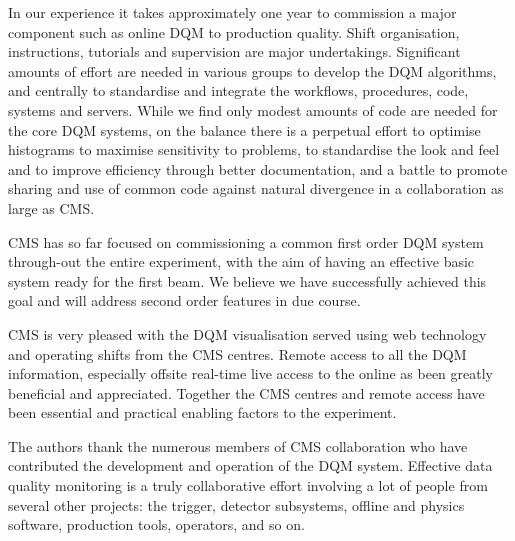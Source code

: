\documentclass[a4paper]{jpconf}
\begin{document}
In our experience it takes approximately one year to commission a major
component such as online DQM to production quality.  Shift organisation,
instructions, tutorials and supervision are major undertakings.  Significant
amounts of effort are needed in various groups to develop the DQM algorithms,
and centrally to standardise and integrate the workflows, procedures, code,
systems and servers.  While we find only modest amounts of code are needed for
the core DQM systems, on the balance there is a perpetual effort to optimise
histograms to maximise sensitivity to problems, to standardise the look and
feel and to improve efficiency through better documentation, and a battle to
promote sharing and use of common code against natural divergence in a
collaboration as large as CMS.

CMS has so far focused on commissioning a common first order DQM system
through-out the entire experiment, with the aim of having an effective basic
system ready for the first beam.  We believe we have successfully achieved
this goal and will address second order features in due course.

CMS is very pleased with the DQM visualisation served using web technology and
operating shifts from the CMS centres.  Remote access to all the DQM
information, especially offsite real-time live access to the online as been
greatly beneficial and appreciated.  Together the CMS centres and remote
access have been essential and practical enabling factors to the experiment.


\ack

The authors thank the numerous members of CMS collaboration who have
contributed the development and operation of the DQM system.  Effective data
quality monitoring is a truly collaborative effort involving a lot of people
from several other projects: the trigger, detector subsystems, offline and
physics software, production tools, operators, and so on.
 
\end{document}
